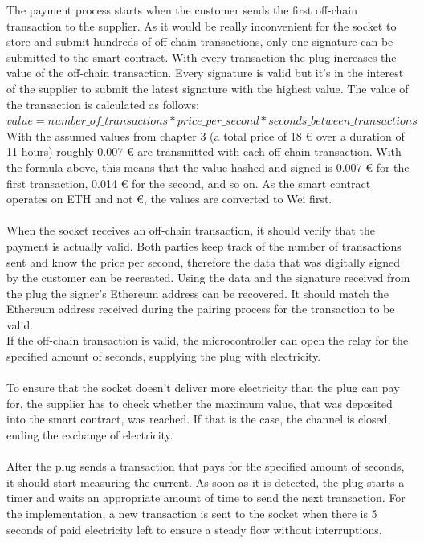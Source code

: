 The payment process starts when the customer sends the first off-chain transaction to the supplier.
As it would be really inconvenient for the socket to store and submit hundreds of off-chain transactions, only one signature can be submitted to the smart contract.
With every transaction the plug increases the value of the off-chain transaction.
Every signature is valid but it's in the interest of the supplier to submit the latest signature with the highest value.
The value of the transaction is calculated as follows:
\\
$value = number\_of\_transactions * price\_per\_second * seconds\_between\_transactions$
\\
With the assumed values from chapter 3 (a total price of 18 \euro{} over a duration of 11 hours) roughly 0.007 \euro{} are transmitted with each off-chain transaction.
With the formula above, this means that the value hashed and signed is 0.007 \euro{} for the first transaction, 0.014 \euro{} for the second, and so on.
As the smart contract operates on ETH and not \euro, the values are converted to Wei first.
\\\\
When the socket receives an off-chain transaction, it should verify that the payment is actually valid.
Both parties keep track of the number of transactions sent and know the price per second, therefore the data that was digitally signed by the customer can be recreated.
Using the data and the signature received from the plug the signer's Ethereum address can be recovered.
It should match the Ethereum address received during the pairing process for the transaction to be valid.
\\
If the off-chain transaction is valid, the microcontroller can open the relay for the specified amount of seconds, supplying the plug with electricity.
\\\\
To ensure that the socket doesn’t deliver more electricity than the plug can pay for, the supplier has to check whether the maximum value, that was deposited into the smart contract, was reached.
If that is the case, the channel is closed, ending the exchange of electricity.
\\\\
After the plug sends a transaction that pays for the specified amount of seconds, it should start measuring the current.
As soon as it is detected, the plug starts a timer and waits an appropriate amount of time to send the next transaction.
For the implementation, a new transaction is sent to the socket when there is 5 seconds of paid electricity left to ensure a steady flow without interruptions.
